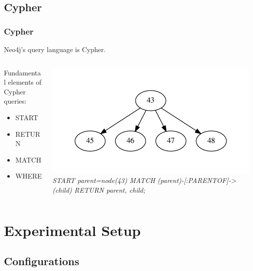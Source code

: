 \documentclass{beamer}
\begin{document}
\subsection{Cypher}

\begin{frame}
	\frametitle{Cypher}
	Neo4j's query language is Cypher.
	\begin{columns}
	\begin{column}{0.40\textwidth}

	Fundamental elements of Cypher queries:
		\begin{itemize}
		\item START
		\item RETURN
		\item MATCH
		\item WHERE
		\end{itemize}
	\end{column}
	\begin{column}{0.60\textwidth}

	\includegraphics[width=.95\textwidth]{parents.pdf}
	\linebreak
	\emph{
START parent=node(43)
\linebreak
MATCH (parent)-[:PARENTOF]->(child)
\linebreak
RETURN parent, child;
}

	\end{column}	
	\end{columns}
\end{frame}

\section[Setup]{Experimental Setup}

\subsection{Configurations}
\end{document}
